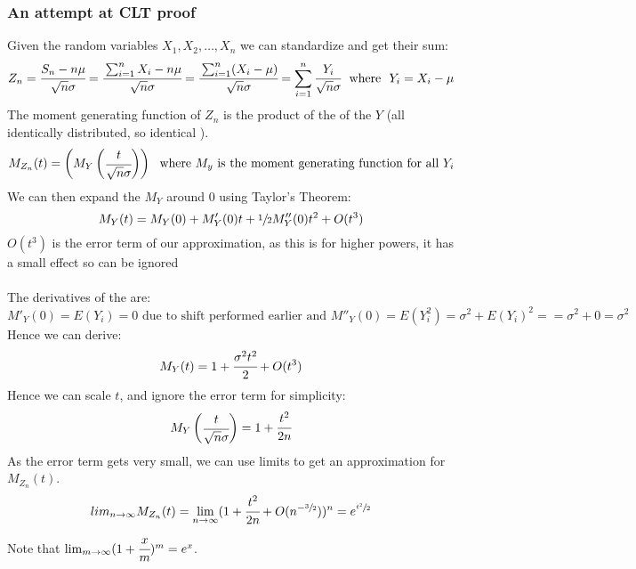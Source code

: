 \documentclass{report}
\begin{document}
\subsubsection*{An attempt at CLT proof}
Given the random variables $X_1, X_2, \dots, X_n$ we can standardize and get their sum:
\[Z_n = \cfrac{S_n - n \mu}{\sqrt{n} \sigma} = \cfrac{\sum_{i=1}^nX_i - n\mu}{\sqrt{n} \sigma} = \cfrac{\sum_{i=1}^n(X_i - \mu)}{\sqrt{n} \sigma} = \sum_{i=1}^n \cfrac{Y_i}{\sqrt{n}\sigma} \ \text{ where } \ Y_i = X_i - \mu\]
The moment generating function of $Z_n$ is the product of the  of the $Y$ (all identically distributed, so identical ).
\[M_{Z_n}(t) = \begin{pmatrix}
		M_Y \begin{pmatrix}
			\cfrac{t}{\sqrt{n}\sigma}
		\end{pmatrix}
	\end{pmatrix} \ \text{ where } M_y \text{ is the moment generating function for all } Y_i\]
We can then expand the $M_Y$ around 0 using Taylor's Theorem:
\[M_Y(t) = M_Y(0) + M'_Y(0)t + \sfrac{1}{2}M''_Y(0)t^2 + O(t^3)\]
$O(t^3)$ is the error term of our approximation, as this is for higher powers, it has a small effect so can be ignored
\\
\\ The derivatives of the  are:
\[M'_Y(0) = E(Y_i) = 0 \text{ due to shift performed earlier and } M''_Y(0) = E(Y_i^2) = \sigma^2 + E(Y_i)^2 = = \sigma^2 + 0 = \sigma^2\]
Hence we can derive:
\[M_Y(t) = 1 + \cfrac{\sigma^2t^2}{2} + O(t^3)\]
Hence we can scale $t$, and ignore the error term for simplicity:
\[M_Y \begin{pmatrix}
		\cfrac{t}{\sqrt{n}\sigma}
	\end{pmatrix} = 1 + \cfrac{t^2}{2n}\]
As the error term gets very small, we can use limits to get an approximation for $M_{Z_n}(t)$.
\[lim_{n \to \infty} M_{Z_n}(t) = \lim_{n \to \infty}(1 + \cfrac{t^2}{2n} + O(n^{-\sfrac{3}{2}}))^n = e^{\sfrac{t^2}{2}}\]
Note that $\lim_{m \to \infty}(1 + \cfrac{x}{m})^m = e^x$.
\end{document}
